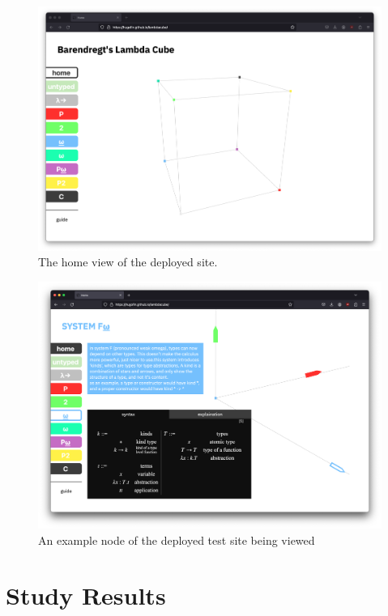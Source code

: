 \documentclass{l4proj}
\begin{document}
\begin{figure}[h!]
    \centering
    \includegraphics[width=0.8\linewidth]{dissertation/images/trial_deployment_home.png}
    \caption{The home view of the deployed site.}
    \label{fig:enter-label}
\end{figure}

\begin{figure}[h!]
    \centering
    \includegraphics[width=0.8\linewidth]{dissertation/images/trial_deployment_zoomed.png}
    \caption{An example node of the deployed test site being viewed}
    \label{fig:enter-label}
\end{figure}

\section{Study Results}
\end{document}
